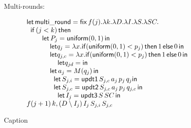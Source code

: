 \documentclass{article}
\begin{document}
\begin{figure}
    \centering
   Multi-rounds:

\[
\begin{array}{l}
 \mathsf{let}\, \mathsf{multi\_round} =   \mathsf{fix} \, f(j). \lambda k. \lambda D. \lambda I. \lambda S. \lambda SC.  \\
 \hspace{.2cm} \mathsf{if}\, (j < k) \, \mathsf{then} \\
  \hspace{.8cm} \mathsf{let} \, P_j =  \mathsf{uniform}(0,1) \, \mathsf{in} \\
  \hspace{1.2cm} \mathsf{let} q_j = \lambda x. \mathsf{if} (\mathsf{uniform}(0,1) < p_j ) \, \mathsf{then} \, 1 \, \mathsf{else} \, 0 \, \mathsf{in} \\
  \hspace{1.2cm} \mathsf{let} q_{j,c} = \lambda x. \mathsf{if} (\mathsf{uniform}(0,1) < p_j ) \, \mathsf{then} \, 1 \, \mathsf{else} \, 0 \, \mathsf{in} \\
  \hspace{1.6cm} \mathsf{let} q_{jd} =    \mathsf{in}\\
 \hspace{1.2cm} \mathsf{let} \, a_j = M (q_j) \, \mathsf{in} \\
 \hspace{1.4cm} \mathsf{let} \, S_{j,i} = \mathsf{updt1} \, S_{j,c} \, a_j \,  p_j \, q_j \mathsf{in}   \\
 \hspace{1.4cm}  \mathsf{let} \,  S_{j,c} = \mathsf{updt2} \, S_{j,c} \, a_j \, p_j \, q_{j,c} \, \mathsf{in}\\
 \hspace{1.6cm} \mathsf{let} \, I_j =  \mathsf{updt3} \, S \, SC \, \mathsf{in} \\
   f (j+1) \, k , (D \setminus I_j) \, I_j \, S_{j,i} \, S_{j,c}
\end{array}
\]
    \caption{Caption}
    \label{fig:my_label}
\end{figure}
\end{document}
